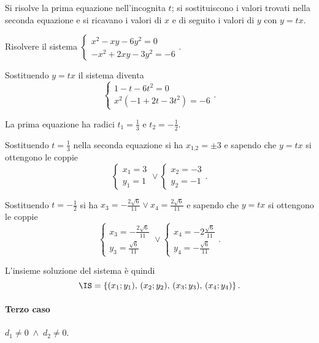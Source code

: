 Si risolve la prima equazione nell'incognita $t$; si sostituiscono i valori trovati nella seconda equazione e si ricavano i valori di $x$ e di seguito i valori di $y$ con $y=tx$.

\begin{exrig}
\begin{esempio}
Risolvere il sistema $\left\{\begin{array}{l}x^2-{xy}-6y^2=0 \\-x^2+2{xy}-3y^2=-6 \end{array}\right.$.

Sostituendo $y=tx$ il sistema diventa 
\[\left\{\begin{array}{l}1-t-6t^2=0 \\x^2(-1+2t-3t^2)=-6 \end{array}\right..\]

La prima equazione ha radici $t_1=\frac 1 3$ e $t_2=-\frac 1 2$.

Sostituendo $t=\frac 1 3$ nella seconda equazione si ha $x_{1\text{,}2}=\pm 3$ e sapendo che $y=tx$ si ottengono le coppie 
\[\left\{\begin{array}{l}x_1=3\\y_1=1\end{array}\right.\vee\left\{\begin{array}{l}x_2=-3\\y_2=-1\end{array}\right..\]

Sostituendo $t=-\frac 1 2$ si ha $x_3=-\frac{2\sqrt 6}{11}\vee x_4=\frac{2\sqrt 6}{11}$ e sapendo che $y={tx}$ si ottengono le coppie 
\[\left\{\begin{array}{l}x_3=-\frac{2\sqrt 6}{11}\\y_3=\frac{\sqrt 6}{11}\end{array}\right.\vee\left\{\begin{array}{l}x_4=-2\frac{\sqrt 6}{11}\\y_4=-\frac{\sqrt 6}{11}\end{array}\right..\]

L'insieme soluzione del sistema è quindi
\[\IS=\left\{(x_1;y_1)\text{, }(x_2;y_2)\text{, }(x_3;y_3)\text{, }(x_4;y_4)\right\}.\]
\end{esempio}
\end{exrig}

\paragraph{Terzo caso} $d_1\neq 0 \;\wedge\; d_2\neq 0$.

